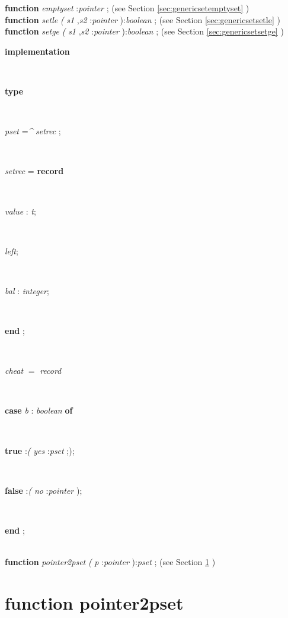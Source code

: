 \documentclass[10pt, a4paper]{article}
\begin{document}
\begin{tabbing}
\<\textsf{\textbf{function}  \textit{emptyset} :\textit{pointer} ;} (see Section \ref{sec:genericsetemptyset} )\\
\<\textsf{\textbf{function}  \textit{setle} \textit{(} \textit{s1} ,\textit{s2} :\textit{pointer} ):\textit{boolean} ;} (see Section \ref{sec:genericsetsetle} )\\
\<\textsf{\textbf{function}  \textit{setge} \textit{(} \textit{s1} ,\textit{s2} :\textit{pointer} ):\textit{boolean} ;} (see Section \ref{sec:genericsetsetge} )\\
\<\parbox{14cm}{\textsf{\textbf{implementation} }}\\
\<\parbox{14cm}{\textsf{\textbf{type} }}\\
\parbox{14cm}{\textsf{\textit{pset} =\textit{\^{}} \textit{setrec} ;}}\\
\+\parbox{14cm}{\textsf{\textit{setrec}  = \textbf{record} }}\\
\parbox{14cm}{\textsf{\textit{value} : \textit{t}}; }\\
\parbox{14cm}{\textsf{\textit{left}}; }\\
\parbox{14cm}{\textsf{\textit{bal} : \textit{integer}}; }\\
\<\-\parbox{14cm}{\textsf{\textbf{end} ;}}\\
\+\parbox{14cm}{\textsf{\textit{cheat} $=$ \textit{record}}}\\
\+\parbox{14cm}{\textsf {\textbf {case } \textsf{\textit{b} : \textit{boolean}} \textbf{ of } }}\\
\parbox{14cm}{\textsf{\textbf{true} :\textit{(} \textit{yes} :\textit{pset} ;);}}\\
\parbox{14cm}{\textsf{\textbf{false} :\textit{(} \textit{no} :\textit{pointer} );}}\\
\<\-\parbox{14cm}{\textsf{\textbf{end} ;}}\\
\<\textsf{\textbf{function}  \textit{pointer2pset} \textit{(} \textit{p} :\textit{pointer} ):\textit{pset} ;} (see Section \ref{sec:genericsetpointer2pset} )\\
\end{tabbing}
\section{function pointer2pset}\label{sec:genericsetpointer2pset}
\end{document}
